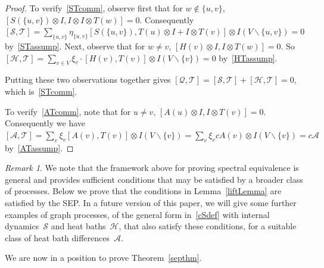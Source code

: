 \documentclass[11pt]{article}
\theoremstyle{plain}
\theoremstyle{definition}
\theoremstyle{remark}
\newtheorem{remark}[theorem]{Remark}
\numberwithin{equation}{section}
\newcommand{\cA}{{\mathcal A}}
\newcommand{\cH}{{\mathcal H}}
\newcommand{\cS}{{\mathcal S}}
\newcommand{\cT}{{\mathcal T}}
\renewcommand{\cS}{{\mathcal Q}}
\newcommand{\cSin}{{\mathcal S}}
\begin{document}
\begin{proof} 
To verify~\eqref{STcomm}, observe first that for $w \notin \{u,v\}$, $[S(\{u,v\}) \otimes I, I \otimes I \otimes T(w)]=0$. Consequently $[\cSin,\cT]=\sum_{\{u,v\}} \eta_{\{u,v\}} [S(\{u,v\}) , T(u)\otimes I + I \otimes T(v)] \otimes I(V\backslash \{u,v\})=0$ by~\eqref{STassump}.  Next, observe that for $w\neq v$, $[H(v)\otimes I, I\otimes T(w)]=0$. So
$[\cH,\cT] = 
\sum_{v \in V} \xi_{v} \cdot [H(v), T(v)] \otimes I(V\backslash \{v\}) =0$ by~\eqref{HTassump}. 

Putting these two observations together gives $[\cS,\cT]=[\cSin,\cT]+[\cH,\cT] = 0$, which is~\eqref{STcomm}.

To verify~\eqref{ATcomm}, note that for $u\neq v$, $[A(u)\otimes I,I\otimes T(v)]=0$. Consequently we have
$[\cA,\cT]=\sum_v \xi_v [A(v),T(v)] \otimes I(V\backslash \{v\}) = \sum_v \xi_v c A(v) \otimes I(V\backslash \{v\}) = c \cA$ by~\eqref{ATassump}.
\end{proof}

\begin{remark}
We note that the framework above for proving spectral equivalence is general and provides
sufficient conditions that may be satisfied by a broader class of processes.  Below we prove that
the conditions in Lemma~\ref{liftLemma} are satisfied by the SEP.  In a future version of this paper,
we will give some further examples of graph processes, of the general form in~\eqref{cSdef} with
internal dynamics~$\cSin$ and heat baths~$\cH$, that also satisfy these conditions, for a suitable
class of heat bath differences~$\cA$. 
\end{remark}

We are now in a position to prove Theorem~\ref{septhm}.
\end{document}
